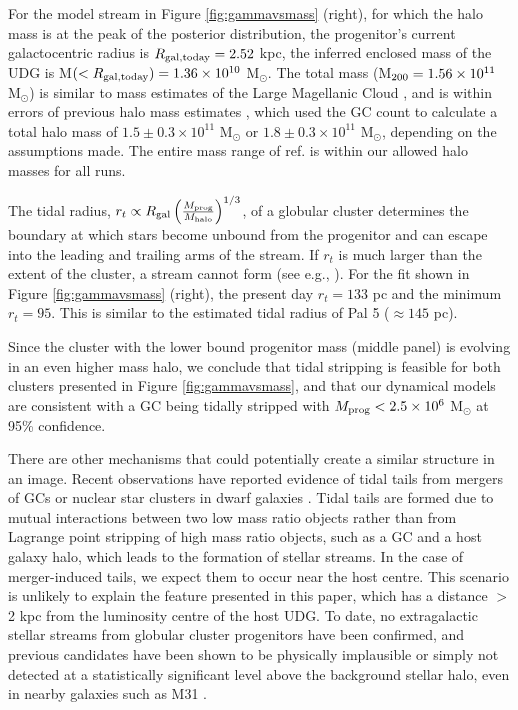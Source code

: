 \documentclass[pdflatex,sn-mathphys-num]{sn-jnl}
\theoremstyle{thmstyleone}
\theoremstyle{thmstyletwo}
\theoremstyle{thmstylethree}
\begin{document}
For the model stream in Figure \ref{fig:gammavsmass} (right), for which the halo mass is at the peak of the posterior distribution, the progenitor's current galactocentric radius is $R_{\rm gal,today} = 2.52$ kpc, the inferred enclosed mass of the UDG  is M$(<R_{\rm gal,today}) = 1.36 \times 10^{10}$ M$_{\odot}$.
The total mass (M$_{\rm 200} = 1.56 \times 10^{11}$ M$_{\odot}$) is similar to mass estimates of the Large Magellanic Cloud
\citep{penarrubia2016, erkal2019},
and is within errors of previous halo mass estimates \citep{Fielder2023}, which used the GC count to calculate a total halo mass
of $1.5\pm 0.3\times 10^{11}$ M$_\odot$ or $1.8\pm 0.3 \times 10^{11}$ M$_\odot$, depending on the assumptions made.
The entire mass range of ref. \citep{Fielder2023} is within our allowed halo masses for all runs.

The tidal radius, $r_t \propto R_{\rm gal}\left(\frac{M_{\rm prog}}{M_{\rm halo}}\right)^{1/3}$, of a globular cluster determines the boundary at which stars become unbound from the progenitor and can escape into the leading and trailing arms of the stream. If $r_t$ is much larger than the extent of the cluster, a stream cannot form (see e.g., \citep[][]{pearson2022b}). For the fit shown in Figure \ref{fig:gammavsmass} (right), the present day $r_t = 133$ pc and the minimum $r_t = 95$.
This is similar to the estimated tidal radius of Pal 5 ($\approx 145$ pc)\citep[][]{Ibata2017}.

Since the cluster with the lower bound progenitor mass (middle panel) is evolving in an even higher mass halo, we conclude that tidal stripping is feasible for both clusters presented in Figure \ref{fig:gammavsmass}, and that our dynamical models are consistent with a GC being tidally stripped with $M_{\rm prog}< 2.5 \times 10^6$ M$_{\odot}$ at 95\% confidence.

There are other mechanisms that could potentially create a similar structure in an image.
Recent observations have reported evidence of tidal tails from mergers of GCs or nuclear star clusters in dwarf galaxies \citep{Poulain2025}. Tidal tails are formed due to mutual interactions between two low mass ratio objects rather than from Lagrange point stripping of high mass ratio objects, such as a GC and a host galaxy halo, which leads to the formation of stellar streams. In the case of merger-induced tails, we expect them to occur near the host centre.
This scenario is unlikely to explain the feature presented in this paper, which has a distance $>$2 kpc from the luminosity centre of the host UDG.
To date, no extragalactic stellar streams from globular cluster progenitors have been confirmed, and previous candidates have been shown to be physically implausible \citep{Abraham2018, Pearson2019, Nibauer2023} or simply not detected at a statistically significant level above the background stellar halo, even in nearby galaxies such as M31 \citep{Pearson2022a}.
\end{document}
